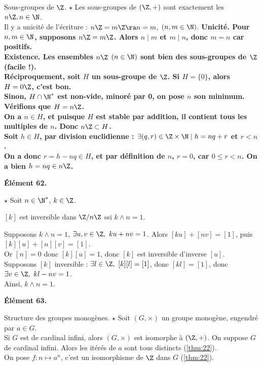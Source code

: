 \documentclass[11pt]{article}
\begin{document}
\begin{thm}{Sous-groupes de $\Z$. $\star$}{}
    Les sous-groupes de $(\Z,+)$ sont exactement les $n\Z,n\in\N$.\\
    Il y a unicité de l'écriture : $n\Z=m\Z\ra n=m$, $(n,m\in\N)$.
    \tcblower
    \bf{Unicité.} Pour $n,m\in\N$, supposons $n\Z=m\Z$. Alors $n\mid m$ et $m\mid n$, donc $m=n$ car positifs.\\
    \bf{Existence.} Les ensembles $n\Z$ $(n\in\N)$ sont bien des sous-groupes de $\Z$ (facile !).\\
    Réciproquement, soit $H$ un sous-groupe de $\Z$. Si $H=\{0\}$, alors $H=0\Z$, c'est bon.\\
    Sinon, $H\cap\N^*$ est non-vide, minoré par 0, on pose $n$ son minimum. Vérifions que $H=n\Z$.\\
    \boxed{\supset} On a $n\in H$, et puisque $H$ est stable par addition, il contient tous les multiples de $n$. Donc $n\Z\subset H$.\\
    \boxed{\subset} Soit $h\in H$, par \bf{division euclidienne} : $\exists (q,r)\in\Z\times\N \mid h = nq+r$ et $r<n$.\\
    On a donc $r=h-nq\in H$, et par définition de $n$, $r=0$, car $0\leq r<n$. On a bien $h=nq\in n\Z$.
\end{thm}

\vspace*{-0.4cm}

\bf{Élément 62.}

\begin{thm}{$\star$}{}
    Soit $n\in\N^*$, $k\in\Z$.
    \begin{center}
        $[k]$ est inversible dans $\Z/n\Z$ ssi $k\land n = 1$.
    \end{center}
    \tcblower
    \boxed{\ra} Supposons $k\land n = 1$, $\exists u,v \in \Z, ~ ku+nv=1$. Alors $[ku]+[nv]=[1]$, puis $[k][u]+[n][v]=[1]$.\\
    Or $[n]=0$ donc $[k][u]=1$, donc $[k]$ est inversible d'inverse $[u]$.\\
    \boxed{\la} Supposons $[k]$ inversible : $\exists l \in \Z, ~ [k][l]=[1]$, donc $[kl]=[1]$, donc $\exists v \in \Z, ~ kl-nv=1$.\\
    Ainsi, $k\land n = 1$.
\end{thm}

\vspace*{-0.4cm}

\bf{Élément 63.}

\begin{thm}{Structure des groupes monogènes. $\star$}{}
    Soit $(G,\times)$ un groupe monogène, engendré par $a\in G$.\\
    Si $G$ est de cardinal infini, alors $(G,\times)$ est isomorphe à $(\Z,+)$.
    \tcblower
     On suppose $G$ de cardinal infini. Alors les itérés de $a$ sont tous distincts (\ref{thm:22}).\\
    On pose $f:n\mapsto a^n$, c'est un isomorphisme de $\Z$ dans $G$ (\ref{thm:22}).
\end{thm}
\end{document}
